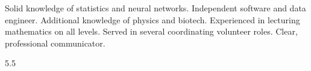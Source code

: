 \documentclass[9pt]{developercv} %
\begin{document}
\vspace{0.5cm}



\begin{minipage}[t]{0.4\textwidth} %
	\vspace{-\baselineskip} %
	
Solid knowledge of statistics and neural networks. Independent software and data engineer. Additional knowledge of physics and biotech. Experienced in lecturing mathematics on all levels. Served in several coordinating volunteer roles. Clear, professional communicator. %
\end{minipage}
\hfill %
\begin{minipage}[t]{0.5\textwidth} %
	\vspace{-\baselineskip} %
	\vspace{-1.8cm}\raggedright
	\begin{barchart}{5.5}

		
	\end{barchart}
\end{minipage}

\begin{center}
\end{center}


\end{document}
